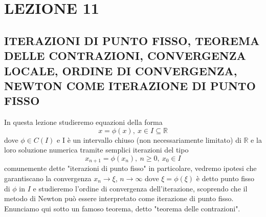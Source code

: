 \documentclass[12pt]{article}
\begin{document}
\section*{LEZIONE 11}
\subsection*{ITERAZIONI DI PUNTO FISSO, TEOREMA DELLE CONTRAZIONI, CONVERGENZA LOCALE, ORDINE DI CONVERGENZA, NEWTON COME ITERAZIONE DI PUNTO FISSO}
In questa lezione studieremo equazioni della forma 
\begin{equation*}
    x=\phi(x), \ x \in I \subseteq \mathbb{R}
\end{equation*}
dove $\phi \in C(I)$ e I è un intervallo chiuso (non necessariamente limitato) di $\mathbb{R}$ e la loro soluzione numerica tramite semplici iterazioni del tipo
\begin{equation*}
    x_{n+1} = \phi(x_n), \ n \geq 0, \ x_0 \in I
\end{equation*}
comunemente dette "iterazioni di punto fisso" in particolare, vedremo ipotesi che garantiscano la convergenza $x_n \rightarrow \xi$, $n \rightarrow \infty$ dove $\xi = \phi(\xi)$ è detto punto fisso di $\phi$ in $I$ e studieremo l'ordine di convergenza dell'iterazione, scoprendo che il metodo di Newton  può essere interpretato come iterazione di punto fisso. \\
Enunciamo qui sotto un famoso teorema, detto "teorema delle contrazioni".\\
\end{document}
